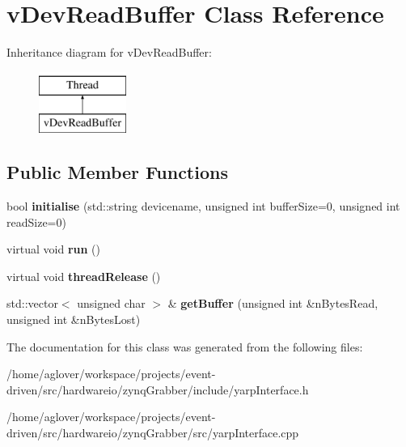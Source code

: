 \hypertarget{classvDevReadBuffer}{}\section{v\+Dev\+Read\+Buffer Class Reference}
\label{classvDevReadBuffer}
Inheritance diagram for v\+Dev\+Read\+Buffer\+:\begin{figure}[H]
\begin{center}
\leavevmode
\includegraphics[height=2.000000cm]{classvDevReadBuffer}
\end{center}
\end{figure}
\subsection*{Public Member Functions}
\begin{DoxyCompactItemize}
\item 
bool {\bfseries initialise} (std\+::string devicename, unsigned int buffer\+Size=0, unsigned int read\+Size=0)\hypertarget{classvDevReadBuffer_aed2023a30193768d35ffc3684c826142}{}\label{classvDevReadBuffer_aed2023a30193768d35ffc3684c826142}

\item 
virtual void {\bfseries run} ()\hypertarget{classvDevReadBuffer_a8d3e3995a073efe42d6a8693b66cf87e}{}\label{classvDevReadBuffer_a8d3e3995a073efe42d6a8693b66cf87e}

\item 
virtual void {\bfseries thread\+Release} ()\hypertarget{classvDevReadBuffer_a763f76c090da36846824bbe5a3365278}{}\label{classvDevReadBuffer_a763f76c090da36846824bbe5a3365278}

\item 
std\+::vector$<$ unsigned char $>$ \& {\bfseries get\+Buffer} (unsigned int \&n\+Bytes\+Read, unsigned int \&n\+Bytes\+Lost)\hypertarget{classvDevReadBuffer_a8fd5cc78799d0b9ddcacd958a84c316e}{}\label{classvDevReadBuffer_a8fd5cc78799d0b9ddcacd958a84c316e}

\end{DoxyCompactItemize}


The documentation for this class was generated from the following files\+:\begin{DoxyCompactItemize}
\item 
/home/aglover/workspace/projects/event-\/driven/src/hardwareio/zynq\+Grabber/include/yarp\+Interface.\+h\item 
/home/aglover/workspace/projects/event-\/driven/src/hardwareio/zynq\+Grabber/src/yarp\+Interface.\+cpp\end{DoxyCompactItemize}
